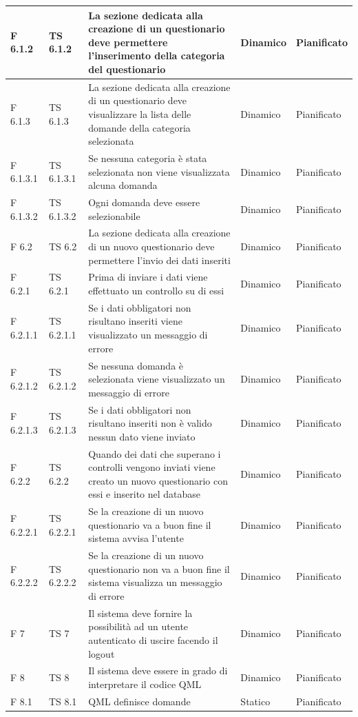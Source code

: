 \documentclass[a4paper,11pt]{article}
\begin{document}
\begin{longtable}{p{}p{}p{}p{}p{}}
\midrule
F 6.1.2 &TS 6.1.2 &La sezione dedicata alla creazione di un questionario deve permettere l'inserimento della categoria del questionario & Dinamico &Pianificato\\
\midrule
F 6.1.3 &TS 6.1.3 &La sezione dedicata alla creazione di un questionario deve visualizzare la lista delle domande della categoria selezionata & Dinamico &Pianificato\\
\midrule
F 6.1.3.1 &TS 6.1.3.1 &Se nessuna categoria è stata selezionata non viene visualizzata alcuna domanda & Dinamico &Pianificato\\
\midrule
F 6.1.3.2 & TS 6.1.3.2 &Ogni domanda deve essere selezionabile & Dinamico &Pianificato\\
\midrule
F 6.2 & TS 6.2 &La sezione dedicata alla creazione di un nuovo questionario deve permettere l'invio dei dati inseriti & Dinamico &Pianificato\\
\midrule
F 6.2.1 & TS 6.2.1 &Prima di inviare i dati viene effettuato un controllo su di essi & Dinamico &Pianificato\\
\midrule
F 6.2.1.1 & TS 6.2.1.1 &Se i dati obbligatori non risultano inseriti viene visualizzato un messaggio di errore & Dinamico &Pianificato\\
\midrule
F 6.2.1.2 &TS 6.2.1.2 &Se nessuna domanda è selezionata viene visualizzato un messaggio di errore & Dinamico &Pianificato\\
\midrule
F 6.2.1.3 & TS 6.2.1.3 &Se i dati obbligatori non risultano inseriti non è valido nessun dato viene inviato & Dinamico &Pianificato\\
\midrule
F 6.2.2 &TS 6.2.2 &Quando dei dati che superano i controlli vengono inviati viene creato un nuovo questionario con essi e inserito nel database & Dinamico &Pianificato\\
\midrule
F 6.2.2.1 &TS 6.2.2.1 &Se la creazione di un nuovo questionario va a buon fine il sistema avvisa l'utente & Dinamico &Pianificato\\
\midrule
F 6.2.2.2 & TS 6.2.2.2 &Se la creazione di un nuovo questionario non va a buon fine il sistema visualizza un messaggio di errore & Dinamico &Pianificato\\
\midrule
F 7 & TS 7&Il sistema deve fornire la possibilità ad un utente autenticato di uscire facendo il logout & Dinamico &Pianificato\\
\midrule
F 8 & TS 8&Il sistema deve essere in grado di interpretare il codice QML & Dinamico &Pianificato\\
\midrule
F 8.1 & TS 8.1&QML definisce domande & Statico &Pianificato\\

\end{longtable}
\end{document}
